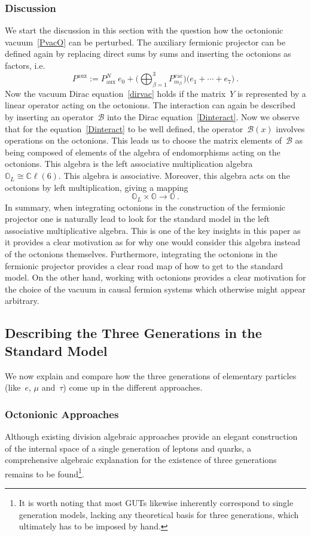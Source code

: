 \documentclass[reqno,11pt]{amsart}
\numberwithin{equation}{section}
\newcommand{\1}{\mbox{\rm 1 \hspace{-1.05 em} 1}}
\newcommand{\B}{{\mathscr{B}}}
\newcommand{\bb}[1]{\mathbb{#1}}
\begin{document}
\subsubsection{Discussion}
We start the discussion in this section with the question how the octonionic vacuum~\eqref{PvacO} can be perturbed.
The auxiliary fermionic projector can be defined again by replacing direct sums by sums
and inserting the octonions as factors, i.e.
\[ P^\text{aux} := P^N_\text{aux} \: e_0 + \bigg( \bigoplus_{\beta=1}^3 P^\text{vac}_{m_\beta} \bigg)
\big( e_1 + \cdots + e_7 \big) \:. \]
Now the vacuum Dirac equation~\eqref{dirvac} holds if the matrix~$Y$ is represented by
a linear operator acting on the octonions. The interaction can again be
described by inserting an operator~$\B$ into the Dirac equation~\eqref{Dinteract}.
Now we observe that for the equation~\eqref{Dinteract} to be well defined,
the operator~$\B(x)$ involves operations on the octonions.
This leads us to choose the matrix elements of~$\B$ 
as being composed of elements of the algebra of endomorphisms acting on the octonions.
This algebra is the left associative multiplication algebra~$\bb{O}_L\cong \bb{C}\ell(6)$. This
algebra is associative. Moreover, this algebra acts on
the octonions by left multiplication, giving a mapping
\[  \bb{O}_L \times \mathbb{O} \rightarrow \mathbb{O} \:. \]
In summary, when integrating octonions in the construction of the fermionic projector one is naturally lead to look for the standard model in the left associative multiplicative algebra. This is one of the key insights in this paper as it provides a clear motivation as for why one would consider this algebra instead of the octonions themselves.
Furthermore, integrating the octonions in the fermionic projector provides a clear road map of how to get to the standard model. On the other hand, working with octonions provides a clear motivation for the choice of the vacuum in causal fermion systems which otherwise might appear arbitrary. 

\subsection{Describing the Three Generations in the Standard Model} \label{secthreegen}
We now explain and compare how the three generations of elementary particles
(like~$e$, $\mu$ and~$\tau$) come up in the different approaches.
\subsubsection{Octonionic Approaches}
Although existing division algebraic approaches provide an elegant construction of the internal space of a single generation of leptons and quarks, a comprehensive algebraic explanation for the existence of three generations remains to be found\footnote{It is worth noting that most GUTs likewise inherently correspond to single generation models, lacking any theoretical basis for three generations, which ultimately has to be imposed by hand.}.
\end{document}
